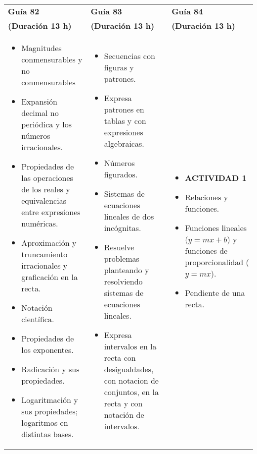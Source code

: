 \documentclass[12pt,a4paper]{article}
\begin{document}
\begin{center}
\begin{tabular}{|
		>{\centering\arraybackslash}m{4.5cm}|
		>{\centering\arraybackslash}m{4.5cm}|
		>{\centering\arraybackslash}m{4.5cm}|}
\hline
\rowcolor{fondogris}
\textbf{Guía 82} & \textbf{Guía 83} & \textbf{Guía 84} \\
\rowcolor{fondogris}
\textbf{(Duración 13 h)} & \textbf{(Duración 13 h)} & \textbf{(Duración 13 h)} \\
\hline
\begin{itemize}[leftmargin=*]
\item Magnitudes conmensurables y no conmensurables
\item Expansión decimal no periódica y los números irracionales.
\item Propiedades de las operaciones de los reales y equivalencias entre expresiones numéricas.
\item Aproximación y truncamiento irracionales y graficación en la recta.
\item Notación científica.
\item Propiedades de los exponentes.
\item Radicación y sus propiedades.
\item Logaritmación y sus propiedades; logaritmos en distintas bases.
\end{itemize}
&
\begin{itemize}[leftmargin=*]
\item Secuencias con figuras y patrones.
\item Expresa patrones en tablas y con expresiones algebraicas.
\item Números figurados.
\item Sistemas de ecuaciones lineales de dos incógnitas.
\item Resuelve problemas planteando y resolviendo sistemas de ecuaciones lineales.
\item Expresa intervalos en la recta con desigualdades, con notacion de conjuntos, en la recta y con notación de intervalos.
\end{itemize}
&
\begin{itemize}[leftmargin=*]
\item{\textbf{ACTIVIDAD 1}}
\item Relaciones y funciones.
\item Funciones lineales ($y=mx+b$) y funciones de proporcionalidad ($y=mx$).
\item Pendiente de una recta.

\end{itemize}
\end{tabular}
\end{center}
\end{document}

